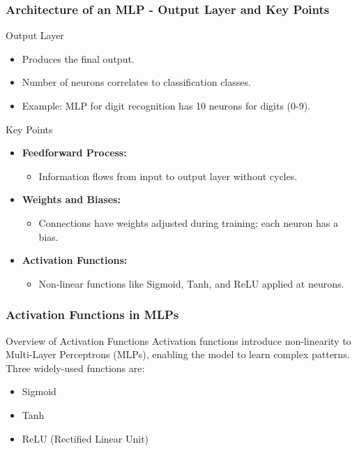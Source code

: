 \documentclass[aspectratio=169]{beamer}
\begin{document}
\begin{frame}[fragile]
    \frametitle{Architecture of an MLP - Output Layer and Key Points}
    \begin{block}{Output Layer}
        \begin{itemize}
            \item Produces the final output.
            \item Number of neurons correlates to classification classes.
            \item Example: MLP for digit recognition has 10 neurons for digits (0-9).
        \end{itemize}
    \end{block}

    \begin{block}{Key Points}
        \begin{itemize}
            \item \textbf{Feedforward Process:} 
              \begin{itemize}
                \item Information flows from input to output layer without cycles.
              \end{itemize}
            \item \textbf{Weights and Biases:} 
              \begin{itemize}
                \item Connections have weights adjusted during training; each neuron has a bias.
              \end{itemize}
            \item \textbf{Activation Functions:} 
              \begin{itemize}
                \item Non-linear functions like Sigmoid, Tanh, and ReLU applied at neurons.
              \end{itemize}
        \end{itemize}
    \end{block}
\end{frame}

\begin{frame}[fragile]
    \frametitle{Activation Functions in MLPs}
    \begin{block}{Overview of Activation Functions}
        Activation functions introduce non-linearity to Multi-Layer Perceptrons (MLPs), enabling the model to learn complex patterns. Three widely-used functions are:
        \begin{itemize}
            \item Sigmoid
            \item Tanh
            \item ReLU (Rectified Linear Unit)
        \end{itemize}
    \end{block}
\end{frame}
\end{document}

